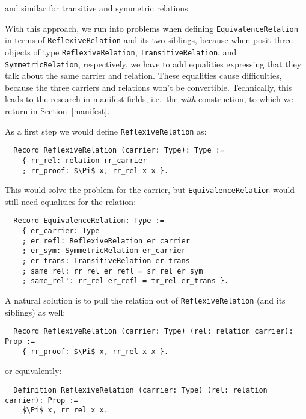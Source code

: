 \documentclass[a4paper,10pt,runningheads]{llncs}
\begin{document}
and similar for transitive and symmetric relations.

With this approach, we run into problems when defining \lstinline|EquivalenceRelation| in terms of
\lstinline|ReflexiveRelation| and its two siblings, because when posit three objects of type
\lstinline|ReflexiveRelation|, \lstinline|TransitiveRelation|, and \lstinline|SymmetricRelation|, respectively, we have to
add equalities expressing that they talk about the same carrier and relation. These equalities
cause difficulties, because the three carriers and relations won't be convertible.
Technically, this leads to the research in manifest fields, i.e.\ the \emph{with} construction, to
which we return in Section~\ref{manifest}.

As a first step we would define \lstinline|ReflexiveRelation| as:
\begin{lstlisting}
  Record ReflexiveRelation (carrier: Type): Type :=
    { rr_rel: relation rr_carrier
    ; rr_proof: $\Pi$ x, rr_rel x x }.
\end{lstlisting}

This would solve the problem for the carrier, but \lstinline|EquivalenceRelation| would still need equalities for the relation:
\begin{lstlisting}
  Record EquivalenceRelation: Type :=
    { er_carrier: Type
    ; er_refl: ReflexiveRelation er_carrier
    ; er_sym: SymmetricRelation er_carrier
    ; er_trans: TransitiveRelation er_trans
    ; same_rel: rr_rel er_refl = sr_rel er_sym
    ; same_rel': rr_rel er_refl = tr_rel er_trans }.
\end{lstlisting}


A natural solution is to pull the relation out of \lstinline|ReflexiveRelation| (and its siblings) as well:
\begin{lstlisting}
  Record ReflexiveRelation (carrier: Type) (rel: relation carrier): Prop :=
    { rr_proof: $\Pi$ x, rr_rel x x }.
\end{lstlisting}

or equivalently:
\begin{lstlisting}
  Definition ReflexiveRelation (carrier: Type) (rel: relation carrier): Prop :=
    $\Pi$ x, rr_rel x x.
\end{lstlisting}
\end{document}
